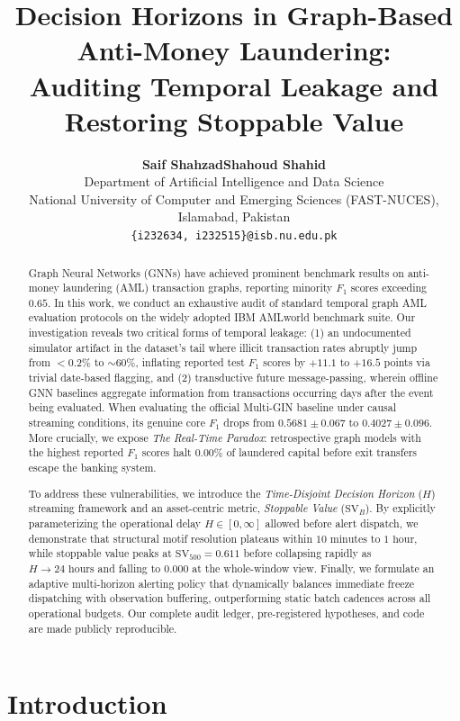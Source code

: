 \documentclass[10pt,twocolumn,letterpaper]{article}
\title{\LARGE\bfseries Decision Horizons in Graph-Based Anti-Money Laundering:\\Auditing Temporal Leakage and Restoring Stoppable Value}
\author{
    \textbf{Saif Shahzad}\quad\quad\textbf{Shahoud Shahid}\\[0.15cm]
    \small Department of Artificial Intelligence and Data Science\\
    \small National University of Computer and Emerging Sciences (FAST-NUCES), Islamabad, Pakistan\\
    \small \texttt{\{i232634, i232515\}@isb.nu.edu.pk}
}
\date{}
\begin{document}
\maketitle

\begin{abstract}
Graph Neural Networks (GNNs) have achieved prominent benchmark results on anti-money laundering (AML) transaction graphs, reporting minority $F_1$ scores exceeding $0.65$. In this work, we conduct an exhaustive audit of standard temporal graph AML evaluation protocols on the widely adopted IBM AMLworld benchmark suite. Our investigation reveals two critical forms of temporal leakage: (1) an undocumented simulator artifact in the dataset's tail where illicit transaction rates abruptly jump from $<0.2\%$ to $\sim60\%$, inflating reported test $F_1$ scores by $+11.1$ to $+16.5$ points via trivial date-based flagging, and (2) transductive future message-passing, wherein offline GNN baselines aggregate information from transactions occurring days after the event being evaluated. When evaluating the official Multi-GIN baseline under causal streaming conditions, its genuine core $F_1$ drops from $0.5681\pm0.067$ to $0.4027\pm0.096$. More crucially, we expose \emph{The Real-Time Paradox}: retrospective graph models with the highest reported $F_1$ scores halt $0.00\%$ of laundered capital before exit transfers escape the banking system.

To address these vulnerabilities, we introduce the \emph{Time-Disjoint Decision Horizon} ($H$) streaming framework and an asset-centric metric, \emph{Stoppable Value} ($\text{SV}_B$). By explicitly parameterizing the operational delay $H\in[0,\infty]$ allowed before alert dispatch, we demonstrate that structural motif resolution plateaus within $10\text{ minutes to }1\text{ hour}$, while stoppable value peaks at $\text{SV}_{500}=0.611$ before collapsing rapidly as $H\to 24\text{ hours}$ and falling to $0.000$ at the whole-window view. Finally, we formulate an adaptive multi-horizon alerting policy that dynamically balances immediate freeze dispatching with observation buffering, outperforming static batch cadences across all operational budgets. Our complete audit ledger, pre-registered hypotheses, and code are made publicly reproducible.
\end{abstract}

\section{Introduction}
\label{sec:intro}
\end{document}
